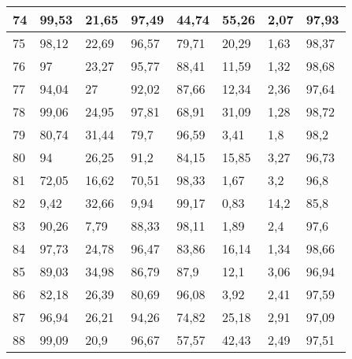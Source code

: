 \begin{longtable}[c]{|l|l|l|l|l|l|l|l|}
74              & 99,53        & 21,65        & 97,49       & 44,74         & 55,26         & 2,07          & 97,93         \\ \hline
75              & 98,12        & 22,69        & 96,57       & 79,71         & 20,29         & 1,63          & 98,37         \\ \hline
76              & 97           & 23,27        & 95,77       & 88,41         & 11,59         & 1,32          & 98,68         \\ \hline
77              & 94,04        & 27           & 92,02       & 87,66         & 12,34         & 2,36          & 97,64         \\ \hline
78              & 99,06        & 24,95        & 97,81       & 68,91         & 31,09         & 1,28          & 98,72         \\ \hline
79              & 80,74        & 31,44        & 79,7        & 96,59         & 3,41          & 1,8           & 98,2          \\ \hline
80              & 94           & 26,25        & 91,2        & 84,15         & 15,85         & 3,27          & 96,73         \\ \hline
81              & 72,05        & 16,62        & 70,51       & 98,33         & 1,67          & 3,2           & 96,8          \\ \hline
82              & 9,42         & 32,66        & 9,94        & 99,17         & 0,83          & 14,2          & 85,8          \\ \hline
83              & 90,26        & 7,79         & 88,33       & 98,11         & 1,89          & 2,4           & 97,6          \\ \hline
84              & 97,73        & 24,78        & 96,47       & 83,86         & 16,14         & 1,34          & 98,66         \\ \hline
85              & 89,03        & 34,98        & 86,79       & 87,9          & 12,1          & 3,06          & 96,94         \\ \hline
86              & 82,18        & 26,39        & 80,69       & 96,08         & 3,92          & 2,41          & 97,59         \\ \hline
87              & 96,94        & 26,21        & 94,26       & 74,82         & 25,18         & 2,91          & 97,09         \\ \hline
88              & 99,09        & 20,9         & 96,67       & 57,57         & 42,43         & 2,49          & 97,51         \\ \hline

\end{longtable}

